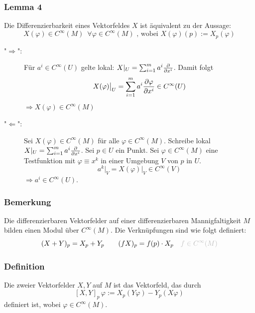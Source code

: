 \subsubsection[Lemma 4: Differenzierbarkeit eines Vektorfeldes]{Lemma 4} %
\label{ssub:212}
Die Differenzierbarkeit eines Vektorfeldes $X$ ist äquivalent zu der Aussage:
\[
	X(\varphi) \in C^\infty(M) \enspace\forall \varphi \in C^\infty(M) \text{ , wobei } X(\varphi)(p) := X_p(\varphi)
\]
\begin{description}
	\item["$\Rightarrow $":] Für $a^i \in C^\infty(U)$ gelte lokal: $X|_U = \sum_{i=1}^{m} a^i \frac{{\partial }}{{\partial x^i}}  $. Damit folgt
	\[
		X(\varphi)\big|_U = \sum_{i=1}^{m} a^i \frac{{\partial \varphi}}{{\partial x^i}}  \in C^\infty(U) 
	\] 
	$\Rightarrow X(\varphi) \in C^\infty(M)$
	\item["$\Leftarrow$":] Sei $X(\varphi) \in C^\infty(M)$ für alle $\varphi \in C^\infty(M)$. Schreibe lokal $X|_U = \sum_{i=1}^{m} a^i \frac{{\partial }}{{\partial x^i}} $. Sei $p\in U$  ein
	Punkt. Sei $\varphi \in C^\infty(M)$ eine Testfunktion mit $\varphi \equiv x^k$ in einer Umgebung $V$ von $p$ in $U$.
	\[
		a^k\big|_V = X(\varphi)|_V \in C^\infty(V)
	\]
	$\Rightarrow a^i \in C^\infty(U)$. \bewende
\end{description}

\subsubsection[Bemerkung: Modul der differenzierbaren Vektorfelder auf einer Mannigfaltigkeit]{Bemerkung} %
\label{ssub:213}
Die differenzierbaren Vektorfelder auf einer differenzierbaren Mannigfaltigkeit $M$ bilden einen Modul über $C^\infty(M)$. Die Verknüpfungen sind wie folgt definiert:
\[
	(X +Y)_p = X_p + Y_p \qquad (f X)_p = f(p) \cdot X_p \quad {\color{lightgray} f\in C^\infty(M)}
\]

\subsubsection[Definition: Lie-Klammer]{Definition} %
\label{ssub:214}
Die  zweier Vektorfelder $X,Y$ auf $M$ ist das Vektorfeld, das durch  
\[
	[X,Y]_p \, \varphi := X_p (Y \varphi) - Y_p(X \varphi)
\]
definiert ist, wobei $\varphi \in C^\infty(M)$.

